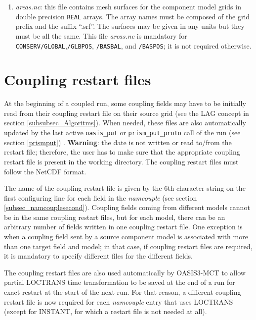 \begin{enumerate}
\item {\em areas.nc}: this file contains mesh surfaces for the
  component model grids in double precision {\tt REAL} arrays. The
  array names must be composed of the grid prefix and the suffix
  ``.srf''.  The surfaces may be given in any units but they must be
  all the same. This file {\em areas.nc} is mandatory for {\tt
    CONSERV/GLOBAL},{\tt /GLBPOS}, {\tt /BASBAL}, and {\tt /BASPOS};
  it is not required otherwise.

\end{enumerate}

\section{Coupling restart files}
\label{subsec_restartdata}

At the beginning of a coupled run, some coupling fields may have to be
initially read from their coupling restart file on their source grid
(see the LAG concept in section \ref{subsubsec_Algoritms}). When
needed, these files are also automatically updated by the last active
{\tt oasis\_put} or {\tt prism\_put\_proto} call of the run (see
section \ref{prismput}) .
{\bf Warning}: the date is not written or read to/from the restart
file; therefore, the user has to make sure that the appropriate
coupling restart file is present in the working directory. The
coupling restart files must follow the NetCDF format.


The name of the coupling restart file is given by the 6th character
string on the first configuring line for each field in the {\it
  namcouple} (see section \ref{subsec_namcouplesecond}). Coupling
fields coming from different models cannot be in the same coupling
restart files, but for each model, there can be an arbitrary number of
fields written in one coupling restart file. One exception is when a coupling field sent by a source component model is associated with more than one target field and model; in that case, if coupling restart files are required, it is mandatory to specify different files for the different fields. 

The coupling restart files are also used automatically by OASIS3-MCT
to allow partial LOCTRANS time transformation to be saved at the end
of a run for exact restart at the start of the next run. For that
reason, a different coupling restart file is now required for each {\it
  namcouple} entry that uses LOCTRANS (except for INSTANT, for which a
restart file is not needed at all). 

